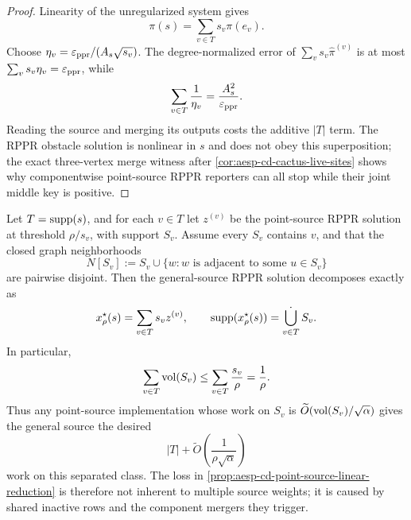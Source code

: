 \begin{proof}
Linearity of the unregularized system gives
\begin{equation*}
 \pi(s)=\sum_{v\in T}s_v\pi(e_v).
\end{equation*}
Choose $\eta_v=\varepsilon_{\mathrm{ppr}}/(A_s\sqrt{s_v})$.  The degree-normalized error of
$\sum_vs_v\widehat\pi^{(v)}$ is at most
$\sum_vs_v\eta_v=\varepsilon_{\mathrm{ppr}}$, while
\begin{equation*}
 \sum_{v\in T}\frac1{\eta_v}=\frac{A_s^2}{\varepsilon_{\mathrm{ppr}}}.
\end{equation*}
Reading the source and merging its outputs costs the additive $|T|$ term.
The RPPR obstacle solution is nonlinear in $s$ and does not obey this
superposition; the exact three-vertex merge witness after
\cref{cor:aesp-cd-cactus-live-sites} shows why componentwise point-source
RPPR reporters can all stop while their joint middle key is positive.
\end{proof}

\begin{proposition}
\label{prop:aesp-cd-separated-source-decomposition}
Let $T=\operatorname{supp}(s)$, and for each $v\in T$ let $z^{(v)}$ be the
point-source RPPR solution at threshold $\rho/s_v$, with support $S_v$.
Assume every $S_v$ contains $v$, and that the closed graph neighborhoods
\begin{equation*}
 N[S_v]:=S_v\cup\{w:\text{$w$ is adjacent to some $u\in S_v$}\}
\end{equation*}
are pairwise disjoint.  Then the general-source RPPR solution decomposes
exactly as
\begin{equation}
 x^\star_\rho(s)=\sum_{v\in T}s_vz^{(v)},
 \qquad
 \operatorname{supp}(x^\star_\rho(s))=\mathop{\dot\bigcup}_{v\in T}S_v.
 \label{eq:aesp-cd-separated-source-decomposition}
\end{equation}
In particular,
\begin{equation}
 \sum_{v\in T}\operatorname{vol}(S_v)
 \leq\sum_{v\in T}\frac{s_v}{\rho}
 =\frac1\rho.
 \label{eq:aesp-cd-separated-source-volume}
\end{equation}
Thus any point-source implementation whose work on $S_v$ is
\(\widetilde O(\operatorname{vol}(S_v)/\sqrt\alpha)\) gives the general source the desired
\begin{equation*}
 |T|+\widetilde O\!\left(\frac1{\rho\sqrt\alpha}\right)
\end{equation*}
work on this separated class.  The loss in
\cref{prop:aesp-cd-point-source-linear-reduction} is therefore not inherent
to multiple source weights; it is caused by shared inactive rows and the
component mergers they trigger.
\end{proposition}

